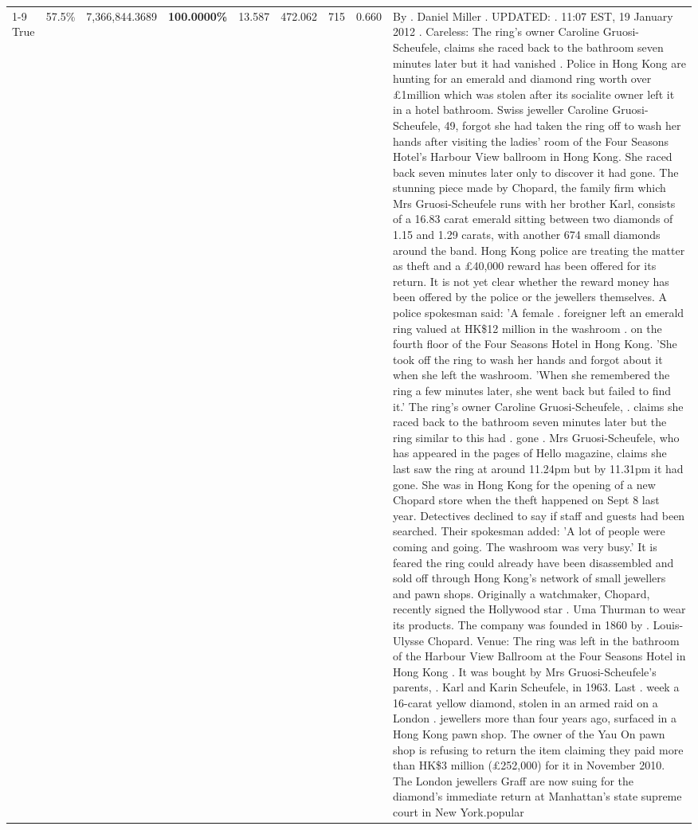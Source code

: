 \begin{table}[H]
\begin{tabular}{lllrlllll}
\cline{1-9}
True & 57.5\% & 7,366,844.3689 & \bfseries \color{red} 100.0000\% & 13.587 & 472.062 & 715 & 0.660 & By . Daniel Miller . UPDATED: . 11:07 EST, 19 January 2012 . Careless: The ring's owner Caroline Gruosi-Scheufele, claims she raced back to the bathroom seven minutes later but it had vanished . Police in Hong Kong are hunting for an emerald and diamond ring worth over £1million which was stolen after its socialite owner left it in a hotel bathroom. Swiss jeweller Caroline Gruosi-Scheufele, 49, forgot she had taken the ring off to wash her hands after visiting the ladies' room of the Four Seasons Hotel's Harbour View ballroom in Hong Kong. She raced back seven minutes later only to discover it had gone. The stunning piece made by Chopard, the family firm which Mrs Gruosi-Scheufele runs with her brother Karl, consists of a 16.83 carat emerald sitting between two diamonds of 1.15 and 1.29 carats, with another 674 small diamonds around the band. Hong Kong police are treating the matter as theft and a £40,000 reward has been offered for its return. It is not yet clear whether the reward money has been offered by the police or the jewellers themselves. A police spokesman said: 'A female . foreigner left an emerald ring valued at HK\$12 million in the washroom . on the fourth floor of the Four Seasons Hotel in Hong Kong. 'She took off the ring to wash her hands and forgot about it when she left the washroom. 'When she remembered the ring a few minutes later, she went back but failed to find it.' The ring's owner Caroline Gruosi-Scheufele, . claims she raced back to the bathroom seven minutes later but the ring similar to this had . gone . Mrs Gruosi-Scheufele, who has appeared in the pages of Hello magazine, claims she last saw the ring at around 11.24pm but by 11.31pm it had gone. She was in Hong Kong for the opening of a new Chopard store when the theft happened on Sept 8 last year. Detectives declined to say if staff and guests had been searched. Their spokesman added: 'A lot of people were coming and going. The washroom was very busy.' It is feared the ring could already have been disassembled and sold off through Hong Kong's network of small jewellers and pawn shops. Originally a watchmaker, Chopard, recently signed the Hollywood star . Uma Thurman to wear its products. The company was founded in 1860 by . Louis-Ulysse Chopard. Venue: The ring was left in the bathroom of the Harbour View Ballroom at the Four Seasons Hotel in Hong Kong . It was bought by Mrs Gruosi-Scheufele's  parents, . Karl and Karin Scheufele, in 1963. Last . week a 16-carat yellow diamond, stolen in an armed raid on a London . jewellers more than four years ago, surfaced in a Hong Kong pawn shop. The owner of the Yau On pawn shop is refusing to return the item claiming they paid more than HK\$3 million (£252,000) for it in November 2010. The London jewellers Graff are now suing for the diamond’s immediate return at Manhattan’s state supreme court in New York.popular \\

\end{tabular}
\end{table}
